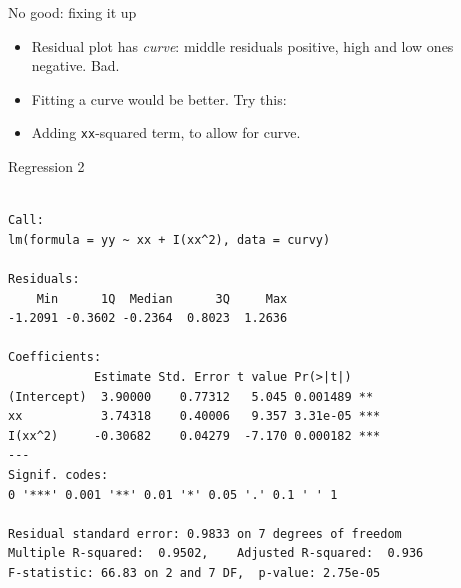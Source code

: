 \begin{frame}[fragile]{No good: fixing it up}

  \begin{itemize}
  \item Residual plot has {\em curve}: middle residuals positive, high and low ones negative. Bad.
  \item Fitting a curve would be better. Try this:
  



\begin{knitrout}
\color{fgcolor}\begin{kframe}
\begin{alltt}
\hlkwb{=}\hlopt{~}\hlopt{+}\hlopt{^}\hlstd{),}
\end{alltt}
\end{kframe}
\end{knitrout}



\item Adding \texttt{xx}-squared term, to allow for curve.
  \end{itemize}


\end{frame}



\begin{frame}[fragile]{Regression 2}
  
{\scriptsize
 
\begin{knitrout}
\color{fgcolor}\begin{kframe}
\begin{alltt}
\end{alltt}
\begin{verbatim}

Call:
lm(formula = yy ~ xx + I(xx^2), data = curvy)

Residuals:
    Min      1Q  Median      3Q     Max 
-1.2091 -0.3602 -0.2364  0.8023  1.2636 

Coefficients:
            Estimate Std. Error t value Pr(>|t|)    
(Intercept)  3.90000    0.77312   5.045 0.001489 ** 
xx           3.74318    0.40006   9.357 3.31e-05 ***
I(xx^2)     -0.30682    0.04279  -7.170 0.000182 ***
---
Signif. codes:  
0 '***' 0.001 '**' 0.01 '*' 0.05 '.' 0.1 ' ' 1

Residual standard error: 0.9833 on 7 degrees of freedom
Multiple R-squared:  0.9502,	Adjusted R-squared:  0.936 
F-statistic: 66.83 on 2 and 7 DF,  p-value: 2.75e-05
\end{verbatim}
\end{kframe}
\end{knitrout}
  }
  
\end{frame}

